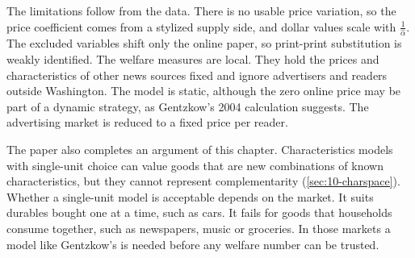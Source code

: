 The limitations follow from the data. There is no usable price variation, so the price coefficient comes from a
stylized supply side, and dollar values scale with $\frac{1}{\hat\alpha}$. The excluded variables shift only the online
paper, so print-print substitution is weakly identified. The welfare measures are local. They hold the prices and
characteristics of other news sources fixed and ignore advertisers and readers outside Washington. The model is
static, although the zero online price may be part of a dynamic strategy, as Gentzkow's 2004 calculation suggests. The
advertising market is reduced to a fixed price per reader.

The paper also completes an argument of this chapter. Characteristics models with single-unit choice can value goods
that are new combinations of known characteristics, but they cannot represent complementarity (\cref{sec:10-charspace}).
Whether a single-unit model is acceptable depends on the market. It suits durables bought one at a time, such as
cars. It fails for goods that households consume together, such as newspapers, music or groceries. In those markets a
model like Gentzkow's is needed before any welfare number can be trusted.

